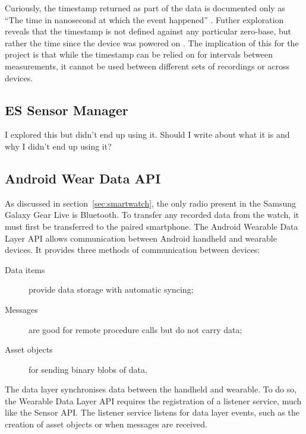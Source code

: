       Curiously, the timestamp returned as part of the data is documented only as ``The time in nanosecond at which the event happened'' \cite{androidsensoreventapi}. Futher exploration reveals that the timestamp is not defined against any particular zero-base, but rather the time since the device was powered on \cite{androidissuedocumentationbug, androidissuehardwarebug}. The implication of this for the project is that while the timestamp can be relied on for intervals between measurements, it cannot be used between different sets of recordings or across devices.
      
      
    \subsection{ES Sensor Manager}
      I explored this but didn't end up using it. Should I write about what it is and why I didn't
      end up using it?

    \subsection{Android Wear Data API}
      \label{sec:prep-data-api}
      As discussed in section~\ref{sec:smartwatch}, the only radio present in the Samsung Galaxy 
      Gear Live is Bluetooth. To transfer any recorded data from the watch, it must first be transferred to the paired smartphone. 
      The Android Wearable Data Layer API allows communication between Android handheld and wearable
      devices. It provides three methods of communication between devices:
      \begin{description}
        \item[Data items] provide data storage with automatic syncing;
        \item[Messages] are good for remote procedure calls but do not carry data;
        \item[Asset objects] for sending binary blobs of data.
      \end{description}
      
      The data layer synchronises data between the handheld and wearable. To do so, the Wearable Data Layer API requires the registration of a listener service, much like the Sensor API. The listener service listens for data layer events, such as the creation of asset objects or when messages are received.      
      
